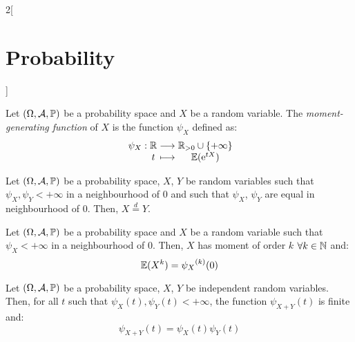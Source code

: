 \documentclass[../../../main.tex]{subfiles}
\begin{document}
\begin{multicols}{2}[\section{Probability}]
\begin{corollary}
  \end{corollary}
  \begin{definition}
    Let $(\Omega,\mathcal{A},\mathbb{P})$ be a probability space and $X$ be a random variable. The \textit{moment-generating function} of $X$ is the function $\psi_X$ defined as:
    $$\function{\psi_X}{\RR}{\RR_{>0}\cup\{+\infty\}}{t}{\Exp(\exp{tX})}$$
  \end{definition}
  \begin{theorem}
    Let $(\Omega,\mathcal{A},\mathbb{P})$ be a probability space, $X$, $Y$ be random variables such that $\psi_X,\psi_Y<+\infty$ in a neighbourhood of 0 and such that $\psi_X$, $\psi_Y$ are equal in neighbourhood of 0. Then, $X\overset{d}{=}Y$.
  \end{theorem}
  \begin{theorem}
    Let $(\Omega,\mathcal{A},\mathbb{P})$ be a probability space and $X$ be a random variable such that $\psi_X<+\infty$ in a neighbourhood of 0. Then, $X$ has moment of order $k$ $\forall k\in\mathbb{N}$ and: $$\mathbb{E}(X^k)={\psi_X}^{(k)}(0)$$
  \end{theorem}
  \begin{theorem}
    Let $(\Omega,\mathcal{A},\mathbb{P})$ be a probability space, $X$, $Y$ be independent random variables. Then, for all $t$ such that $\psi_X(t),\psi_Y(t)<+\infty$, the function $\psi_{X+Y}(t)$ is finite and: $$\psi_{X+Y}(t)=\psi_X(t)\psi_Y(t)$$
  \end{theorem}

\end{multicols}
\end{document}
